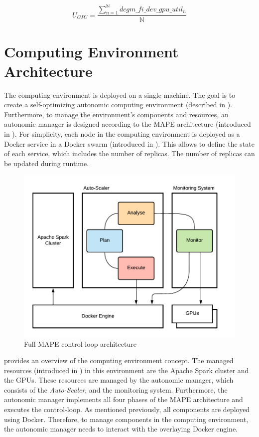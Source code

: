 \begin{equation}
U_{GPU} = \dfrac{\sum_{n=1}^{\mathbb{N}}dcgm\_fi\_dev\_gpu\_util_{n}}{\mathbb{N}}
\label{eq:05_metrics_gpu}
\end{equation}


\section{Computing Environment Architecture}
\label{sec:05_env}
The computing environment is deployed on a single machine.
The goal is to create a self-optimizing autonomic computing environment (described in ).
Furthermore, to manage the environment's components and resources, an autonomic manager is designed according to the MAPE architecture (introduced in ).
For simplicity, each node in the computing environment is deployed as a Docker service in a Docker swarm (introduced in ).
This allows to define the state of each service, which includes the number of replicas. The number of replicas can be updated during runtime.


\begin{figure}[h]
\centering
\includegraphics[scale=1]{images/05_conceptual_design/autonomic_manager/control_loop}
\caption{Full MAPE control loop architecture}
\label{fig:05_am_monitoring_loop_arch}
\end{figure}
 provides an overview of the computing environment concept.
The managed resources (introduced in ) in this environment are the Apache Spark cluster and the GPUs.
These resources are managed by the autonomic manager, which consists of the \textit{Auto-Scaler}, and the monitoring system. Furthermore, the autonomic manager implements all four phases of the MAPE architecture and executes the control-loop.
As mentioned previously, all components are deployed using Docker. Therefore, to manage components in the computing environment, the autonomic manager needs to interact with the overlaying Docker engine.


